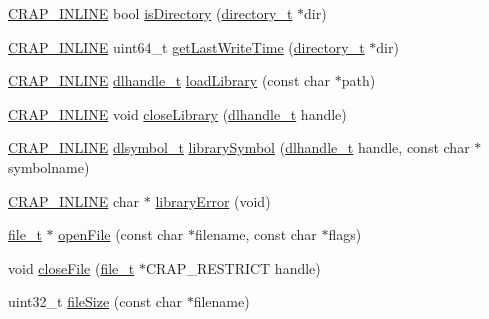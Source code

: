 \begin{DoxyCompactItemize}
\item 
\hyperlink{config__x86_8h_a5a40526b8d842e7ff731509998bb0f1c}{C\+R\+A\+P\+\_\+\+I\+N\+L\+I\+N\+E} bool \hyperlink{namespacecrap_a2fa760b103e7fc9e06340fd046a57778}{is\+Directory} (\hyperlink{namespacecrap_a82911918170604f7fc9e93d66891069c}{directory\+\_\+t} $\ast$dir)
\item 
\hyperlink{config__x86_8h_a5a40526b8d842e7ff731509998bb0f1c}{C\+R\+A\+P\+\_\+\+I\+N\+L\+I\+N\+E} uint64\+\_\+t \hyperlink{namespacecrap_a7bd2dbe20ec67408904dbc70844e7860}{get\+Last\+Write\+Time} (\hyperlink{namespacecrap_a82911918170604f7fc9e93d66891069c}{directory\+\_\+t} $\ast$dir)
\item 
\hyperlink{config__x86_8h_a5a40526b8d842e7ff731509998bb0f1c}{C\+R\+A\+P\+\_\+\+I\+N\+L\+I\+N\+E} \hyperlink{namespacecrap_acee8e66495f007816233ce6b2da6465b}{dlhandle\+\_\+t} \hyperlink{namespacecrap_a2562c2174ac75b91414db38a199f115e}{load\+Library} (const char $\ast$path)
\item 
\hyperlink{config__x86_8h_a5a40526b8d842e7ff731509998bb0f1c}{C\+R\+A\+P\+\_\+\+I\+N\+L\+I\+N\+E} void \hyperlink{namespacecrap_aefd01bce928b74be6029473d7e7c0501}{close\+Library} (\hyperlink{namespacecrap_acee8e66495f007816233ce6b2da6465b}{dlhandle\+\_\+t} handle)
\item 
\hyperlink{config__x86_8h_a5a40526b8d842e7ff731509998bb0f1c}{C\+R\+A\+P\+\_\+\+I\+N\+L\+I\+N\+E} \hyperlink{namespacecrap_a2eba1ed085b0da868a3cd8b2d6a4f7e7}{dlsymbol\+\_\+t} \hyperlink{namespacecrap_a0b7c02b8efc3c8bf6d51391ef06b51d3}{library\+Symbol} (\hyperlink{namespacecrap_acee8e66495f007816233ce6b2da6465b}{dlhandle\+\_\+t} handle, const char $\ast$symbolname)
\item 
\hyperlink{config__x86_8h_a5a40526b8d842e7ff731509998bb0f1c}{C\+R\+A\+P\+\_\+\+I\+N\+L\+I\+N\+E} char $\ast$ \hyperlink{namespacecrap_a2c86a175582d7a91a57dd1e0d6ba856f}{library\+Error} (void)
\item 
\hyperlink{namespacecrap_afd3eedf00a9de7958b7dd70aafff79a4}{file\+\_\+t} $\ast$ \hyperlink{namespacecrap_a95e7097ddb2306595f5b806a08268785}{open\+File} (const char $\ast$filename, const char $\ast$flags)
\item 
void \hyperlink{namespacecrap_ae3f7572940d5aa57594264a780d59789}{close\+File} (\hyperlink{namespacecrap_afd3eedf00a9de7958b7dd70aafff79a4}{file\+\_\+t} $\ast$C\+R\+A\+P\+\_\+\+R\+E\+S\+T\+R\+I\+C\+T handle)
\item 
uint32\+\_\+t \hyperlink{namespacecrap_a33ebe4053661b1006d88f1082cebbd1b}{file\+Size} (const char $\ast$filename)
\item 

\end{DoxyCompactItemize}
